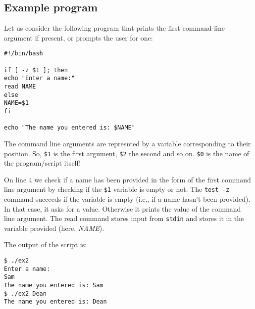\subsection{Example program}
Let us consider the following program that prints the first command-line argument if present, or prompts the user for one:

\vspace{-15pt}
\begin{verbatim}
#!/bin/bash

if [ -z $1 ]; then
echo "Enter a name:"
read NAME
else
NAME=$1
fi

echo "The name you entered is: $NAME"
\end{verbatim}
\vspace{-10pt}	

\noindent
The command line arguments are represnted by a variable corresponding to their position. So, \verb|$1| is the first argument, \verb|$2| the second and so on. \verb|$0| is the name of the program/script itself!

On line 4 we check if a name has been provided in the form of the first command line argument by checking if the \verb|$1| variable is empty or not. The \verb|test -z| command succeeds if the variable is empty (i.e., if a name hasn't been provided). In that case, it asks for a value. Otherwise it prints the value of the command line argument. The read command stores input from \verb|stdin| and stores it in the variable provided (here, \textit{NAME}). 

The output of the script is:

\vspace{-15pt}
\begin{verbatim}
$ ./ex2
Enter a name:
Sam
The name you entered is: Sam
$ ./ex2 Dean
The name you entered is: Dean
\end{verbatim}
\vspace{-10pt}

